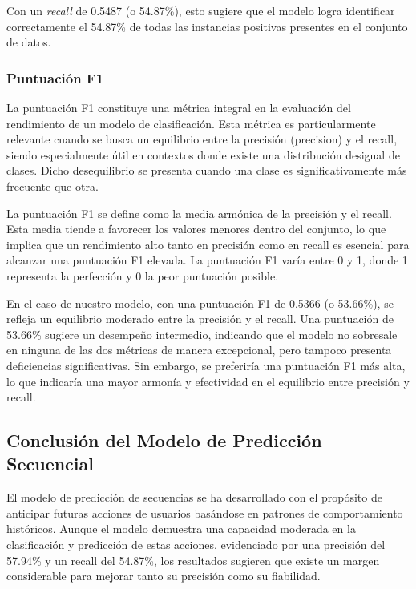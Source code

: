 Con un \textit{recall} de 0.5487 (o 54.87\%), esto sugiere que el modelo logra identificar correctamente el 54.87\% de todas las instancias positivas presentes en el conjunto de datos.

\subsubsection{Puntuación F1}

La puntuación F1 constituye una métrica integral en la evaluación del rendimiento de un modelo de clasificación. Esta métrica es particularmente relevante cuando se busca un equilibrio entre la precisión (precision) y el recall, siendo especialmente útil en contextos donde existe una distribución desigual de clases. Dicho desequilibrio se presenta cuando una clase es significativamente más frecuente que otra.

La puntuación F1 se define como la media armónica de la precisión y el recall. Esta media tiende a favorecer los valores menores dentro del conjunto, lo que implica que un rendimiento alto tanto en precisión como en recall es esencial para alcanzar una puntuación F1 elevada. La puntuación F1 varía entre 0 y 1, donde 1 representa la perfección y 0 la peor puntuación posible.

En el caso de nuestro modelo, con una puntuación F1 de 0.5366 (o 53.66\%), se refleja un equilibrio moderado entre la precisión y el recall. Una puntuación de 53.66\% sugiere un desempeño intermedio, indicando que el modelo no sobresale en ninguna de las dos métricas de manera excepcional, pero tampoco presenta deficiencias significativas. Sin embargo, se preferiría una puntuación F1 más alta, lo que indicaría una mayor armonía y efectividad en el equilibrio entre precisión y recall.

\subsection{Conclusión del Modelo de Predicción Secuencial}

El modelo de predicción de secuencias se ha desarrollado con el propósito de anticipar futuras acciones de usuarios basándose en patrones de comportamiento históricos. Aunque el modelo demuestra una capacidad moderada en la clasificación y predicción de estas acciones, evidenciado por una precisión del 57.94\% y un recall del 54.87\%, los resultados sugieren que existe un margen considerable para mejorar tanto su precisión como su fiabilidad.

